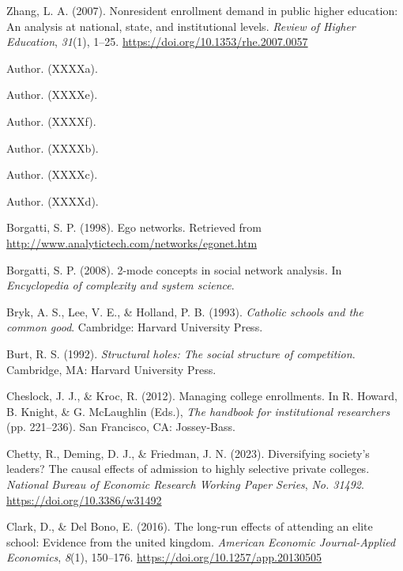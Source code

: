 \documentclass[
  12pt,
]{article}
\newlength{\cslhangindent}
\newlength{\cslentryspacingunit} %
\newenvironment{CSLReferences}[2] %
 {%
  \setlength{\parindent}{0pt}
  \ifodd #1
  \let\oldpar\par
  \def\par{\hangindent=\cslhangindent\oldpar}
  \fi
  \setlength{\parskip}{#2\cslentryspacingunit}
 }%
 {}
\begin{document}
\begin{CSLReferences}{1}{0}
\leavevmode{}%
Zhang, L. A. (2007). Nonresident enrollment demand in public higher education: An analysis at national, state, and institutional levels. \emph{Review of Higher Education}, \emph{31}(1), 1--25. \url{https://doi.org/10.1353/rhe.2007.0057}

\leavevmode{}%
Author. (XXXXa).

\leavevmode{}%
Author. (XXXXe).

\leavevmode{}%
Author. (XXXXf).

\leavevmode{}%
Author. (XXXXb).

\leavevmode{}%
Author. (XXXXc).

\leavevmode{}%
Author. (XXXXd).

\leavevmode{}%
Borgatti, S. P. (1998). Ego networks. Retrieved from \url{http://www.analytictech.com/networks/egonet.htm}

\leavevmode{}%
Borgatti, S. P. (2008). 2-mode concepts in social network analysis. In \emph{Encyclopedia of complexity and system science}.

\leavevmode{}%
Bryk, A. S., Lee, V. E., \& Holland, P. B. (1993). \emph{Catholic schools and the common good}. Cambridge: Harvard University Press.

\leavevmode{}%
Burt, R. S. (1992). \emph{Structural holes: The social structure of competition}. Cambridge, MA: Harvard University Press.

\leavevmode{}%
Cheslock, J. J., \& Kroc, R. (2012). Managing college enrollments. In R. Howard, B. Knight, \& G. McLaughlin (Eds.), \emph{The handbook for institutional researchers} (pp. 221--236). San Francisco, CA: Jossey-Bass.

\leavevmode{}%
Chetty, R., Deming, D. J., \& Friedman, J. N. (2023). Diversifying society's leaders? The causal effects of admission to highly selective private colleges. \emph{National Bureau of Economic Research Working Paper Series}, \emph{No. 31492}. \url{https://doi.org/10.3386/w31492}

\leavevmode{}%
Clark, D., \& Del Bono, E. (2016). The long-run effects of attending an elite school: Evidence from the united kingdom. \emph{American Economic Journal-Applied Economics}, \emph{8}(1), 150--176. \url{https://doi.org/10.1257/app.20130505}


\end{CSLReferences}
\end{document}

